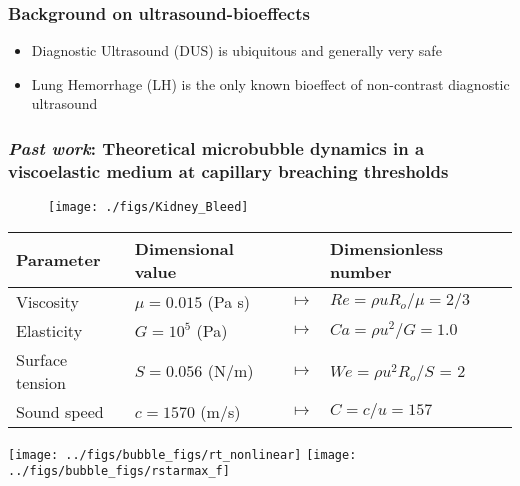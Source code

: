 \begin{frame} \frametitle{Background on ultrasound-bioeffects}
  \begin{itemize}
    \item Diagnostic Ultrasound (DUS) is ubiquitous and generally very safe
    \item Lung Hemorrhage (LH) is the only known bioeffect of non-contrast diagnostic ultrasound
  \end{itemize}
\end{frame}
\begin{frame} \frametitle{\textit{Past work}: Theoretical microbubble dynamics in a viscoelastic medium at capillary breaching thresholds}
\vspace*{\fill}
  \begin{minipage}{\textwidth}
    \begin{minipage}{0.3\textwidth}
      \begin{figure}
        \centering
        \texttt{[image: ./figs/Kidney\_Bleed]}
      \end{figure}
    \end{minipage}
    \begin{minipage}{0.68\linewidth}
    {\tiny
      \vspace*{2pt}

      \vspace*{0.5cm}
      \begin{tabular}{l l c l}
        Parameter & Dimensional value & & Dimensionless number \\ \hline
        Viscosity & $\mu=0.015$ (Pa s) & $\mapsto$ & $Re=\rho u R_o / \mu = 2/3$ \\
        Elasticity & $G=10^5$ (Pa) & $\mapsto$ & $Ca= \rho u^2 / G = 1.0$ 	\\
        Surface tension & $S=0.056$ (N/m) & $\mapsto$ & $We=\rho u^2 R_o / S$ = 2 \\
        Sound speed & $c=1570$ (m/s) & $\mapsto$ & $C = c/u=157$ \\  
      \end{tabular} 
    }
    \end{minipage}
  \end{minipage}

  \vfill

  \begin{minipage}{\textwidth}
    \texttt{[image: ../figs/bubble\_figs/rt\_nonlinear]}\hfill
    \texttt{[image: ../figs/bubble\_figs/rstarmax\_f]}  
  \end{minipage}
\end{frame}
